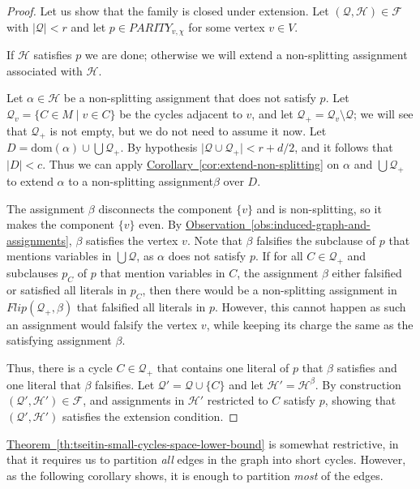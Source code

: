 \documentclass[11pt]{article}
\numberwithin{equation}{section}
\theoremstyle{definition}
\theoremstyle{plain}
\newcommand{\expref}[2]{\hyperref[#2]{#1~\ref{#2}}}
\theoremstyle{plain}
\theoremstyle{definition}
\newcommand{\refth}[1]{\expref{Theorem}{#1}}
\newcommand{\refcor}[1]{\expref{Corollary}{#1}}
\newcommand{\refobs}[1]{\expref{Observation}{#1}}
\newcommand{\domainof}[1]{\ensuremath{\mathrm{dom} ( #1 )}}
\newcommand{\set}[1]{\{ #1 \}}
\newcommand{\setdescr}[3][\mid]{\set{ #2 #1 #3 }}
\newcommand{\setsize}[1]{\lvert#1\rvert}
\newcommand{\union}{\cup}
\newcommand{\Union}{\bigcup}
\newcommand{\formulaformat}[1]{\mathit{#1}}
\newcommand{\tseitinparity}[2]{\ensuremath{\formulaformat{PARITY}_{#1,#2}}}
\newcommand{\connectivityexpansionnot}{c}
\newcommand{\nonsplitting}{non-splitting\xspace}
\newcommand{\nonsplittingassignment}{\nonsplitting assignment\xspace}
\newcommand{\flip}[2]{\mathit{Flip}(#1,#2)}
\newcommand{\kextendiblenot}{r}
\newcommand{\partitionnot}{\mathcal{Q}}
\newcommand{\assignmentsetnot}{\mathcal{H}}
\newcommand{\structuredassignmentsnot}[1][]{(\partitionnot #1,\assignmentsetnot #1)}
\newcommand{\kextendfamily}{\ensuremath{\mathcal{F}}\xspace}
\newcommand{\tseitincharge}{\chi}
\begin{document}
\begin{proof}
  Let us show that the family is closed under extension. Let $(\partitionnot,\assignmentsetnot)\in\kextendfamily$ with $\setsize{\partitionnot} < \kextendiblenot$ and let $p\in\tseitinparity{v}{\tseitincharge}$ for some vertex $v\in V$.

  If $\assignmentsetnot$ satisfies $p$ we are done; otherwise we will extend a \nonsplittingassignment associated with $\assignmentsetnot$.

  Let $\alpha\in\assignmentsetnot$ be a \nonsplittingassignment that does not satisfy $p$. Let $\partitionnot_v=\setdescr{C\in M}{v\in C}$ be the cycles adjacent to $v$, and let $\partitionnot_+=\partitionnot_v\setminus\partitionnot$; we will see that $\partitionnot_+$ is not empty, but we do not need to assume it now. Let $D=\domainof{\alpha}\union\Union\partitionnot_+$. By hypothesis $\setsize{\partitionnot\union\partitionnot_+} < \kextendiblenot + d/2$, and it follows that $\setsize{D} < \connectivityexpansionnot$. Thus we can apply \refcor{cor:extend-non-splitting} on $\alpha$ and $\Union\partitionnot_+$ to extend $\alpha$ to a \nonsplittingassignment $\beta$ over $D$.

The assignment $\beta$ disconnects the component $\set{v}$ and is \nonsplitting, so it makes the component $\set{v}$ even. By \refobs{obs:induced-graph-and-assignments}, $\beta$ satisfies the vertex $v$. Note that $\beta$ falsifies the subclause of $p$ that mentions variables in $\Union\partitionnot$, as $\alpha$ does not satisfy $p$. If for all $C\in\partitionnot_+$ and subclauses $p_C$ of $p$ that mention variables in $C$, the assignment $\beta$ either falsified or satisfied all literals in $p_C$, then there would be a \nonsplittingassignment in $\flip{\partitionnot_+}{\beta}$ that falsified all literals in $p$. However, this cannot happen as such an assignment would falsify the vertex $v$, while keeping its charge the same as the satisfying assignment $\beta$.

Thus, there is a cycle $C\in\partitionnot_+$ that contains one literal of $p$ that $\beta$ satisfies and one literal that $\beta$ falsifies. Let $\partitionnot'=\partitionnot\union\set{C}$ and let $\assignmentsetnot'=\assignmentsetnot^\beta$. By construction $\structuredassignmentsnot['] \in \kextendfamily$, and assignments in $\assignmentsetnot'$ restricted to $C$ satisfy $p$, showing that $\structuredassignmentsnot[']$ satisfies the extension condition.
\end{proof}

\refth{th:tseitin-small-cycles-space-lower-bound} is somewhat restrictive, in that it requires us to partition \emph{all} edges in the graph into short cycles. However, as the following corollary shows, it is enough to partition \emph{most} of the edges.
\end{document}
